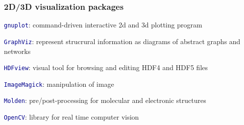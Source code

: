 \begin{frame}
\frametitle{2D/3D visualization packages}

\begin{small}
\vspace{-2mm}
\textcolor{DarkRed}{} \textcolor{DarkBlue}{\tt gnuplot}: %
        command-driven interactive 2d and 3d plotting program

\vspace{1.15mm}
\textcolor{DarkRed}{} \textcolor{DarkBlue}{\tt GraphViz}: %
        represent strucrural information as diagrams of abstract graphs and networks

\vspace{1.15mm}
\textcolor{DarkRed}{} \textcolor{DarkBlue}{\tt HDFview}: %
        visual tool for browsing and editing HDF4 and HDF5 files

\vspace{1.15mm}
\textcolor{DarkRed}{} \textcolor{DarkBlue}{\tt ImageMagick}: %
        manipulation of image

\vspace{1.15mm}
\textcolor{DarkRed}{} \textcolor{DarkBlue}{\tt Molden}: %
        pre/post-processing for molecular and electronic structures

\vspace{1.15mm}
\textcolor{DarkRed}{} \textcolor{DarkBlue}{\tt OpenCV}: %
        library for real time computer vision


\end{small}
\end{frame}
